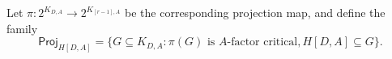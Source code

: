 \documentclass[10pt]{amsart}
\theoremstyle{definition}
\begin{document}
	\vspace{.7ex}
	
	Let $\pi : 2^{K_{D,A}} \to 2^{K_{[r-1], A}}$ be the corresponding projection map, and 
	define %
	the family 
	\[\mathsf{Proj}_{H[D,A]} = \{G\subseteq K_{D,A} : \pi(G) 
	\text{ is $A$-factor critical}, H[D,A]\subseteq G 
	\}.\]
	
	
\end{document}
